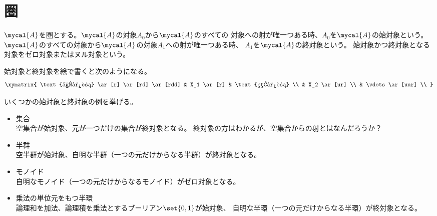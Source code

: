 \section{圏}\label{s1:圏} %
	\begin{definition}[始対象と終対象]\label{def:始対象と終対象} %
		$\mycal{A}$を圏とする。$\mycal{A}$の対象$A_0$から$\mycal{A}$のすべての
		対象への射が唯一つある時、$A_0$を$\mycal{A}$の始対象という。
		$\mycal{A}$のすべての対象から$\mycal{A}$の対象$A_1$への射が唯一つある時、
		$A_1$を$\mycal{A}$の終対象という。
		始対象かつ終対象となる対象をゼロ対象またはヌル対象という。
	\end{definition} %

	始対象と終対象を絵で書くと次のようになる。
	\begin{equation*}\xymatrix{
		\text{始対象} \ar[r] \ar[rd] \ar[rdd] & X_1 \ar[r] & \text{終対象} \\
		& X_2 \ar[ur] \\
		& \vdots \ar[uur] \\
	}\end{equation*}

	\begin{example}[始対象と終対象の例]\label{eg:始対象と終対象の例} %
		いくつかの始対象と終対象の例を挙げる。
		\begin{itemize}
			\item 集合 \\
			空集合が始対象、元が一つだけの集合が終対象となる。
			終対象の方はわかるが、空集合からの射とはなんだろうか？
			\item 半群 \\
			空半群が始対象、自明な半群（一つの元だけからなる半群）が終対象となる。
			\item モノイド \\
			自明なモノイド（一つの元だけからなるモノイド）がゼロ対象となる。
			\item 乗法の単位元をもつ半環 \\
			論理和を加法、論理積を乗法とするブーリアン$\set{0,1}$が始対象、
			自明な半環（一つの元だけからなる半環）が終対象となる。
		\end{itemize}
	\end{example} %
